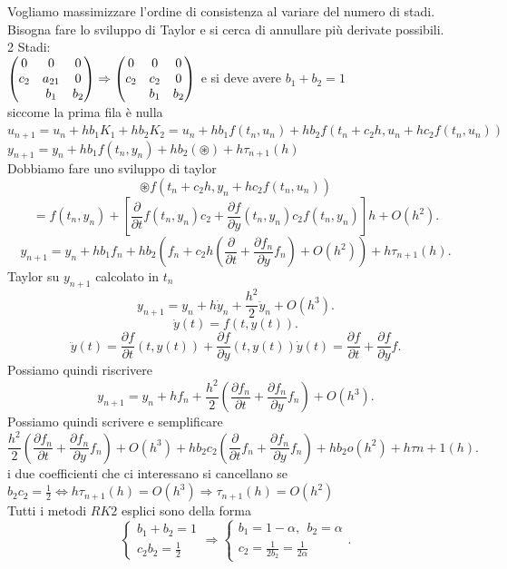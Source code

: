 \documentclass[12px]{article}
\begin{document}
	  Vogliamo massimizzare l'ordine di consistenza al variare del numero di stadi.\\
	  Bisogna fare lo sviluppo di Taylor e si cerca di annullare più derivate possibili.\\
	  2 Stadi:\\
	  $\begin{pmatrix}0 & 0 & 0\\
		  c_2 & a_{21}& 0\\
		      & b_1 & b_2\end{pmatrix} \Rightarrow \begin{pmatrix}0 & 0 & 0\\ c_2 & c_2 &0\\
		      & b_1 &b_2\end{pmatrix} $ e si deve avere $b_1 +b_2 = 1$\\
 siccome la prima fila è nulla\\
		      $u_{n+1} = u_n + hb_1K_1 + hb_2K_2 = u_n + hb_1f(t_n,u_n)+h b_2f(t_n+c_2h, u_n + hc_2f(t_n,u_n))$\\
		      $y_{n+1} = y_n + hb_1 f(t_n,y_n) + h b_2 (\circledast)+h\tau_{n+1}(h)$\\
Dobbiamo fare uno sviluppo di taylor
\[
	\circledast f(t_n + c_2h , y_n + hc_2f(t_n,u_n)) 
\] 
\[
=f(t_n,y_n) +[ \frac {\partial}{\partial t} f(t_n,y_n)c_2 + \frac{\partial f}{\partial y}(t_n,y_n)c_2 f(t_n,y_n)]h + O(h^2)
.\] 
\[
	y_{n+1} = y_n + hb_1f_n + hb_2(f_n + c_2h(\frac{\partial}{\partial t} + \frac{\partial f_n}{\partial y}f_n) +O(h^2)) + h\tau_{n+1}(h)
.\] 
Taylor su $y_{n+1}$ calcolato in $t_n$
 \[
	 y_{n+1} = y_n + h\dot y_n+ \frac{h^2}{2}\ddot y_n + O(h^3)
.\] 
\[
\dot y(t) = f(t,y(t))
.\] 
\[
	\ddot y(t) = \frac{\partial f}{\partial t}(t,y(t)) + \frac{\partial f}{\partial y}(t,y(t))\dot y(t) = \frac{\partial f}{\partial t} + \frac{\partial f}{\partial y}f
.\] 
Possiamo quindi riscrivere
 \[
	 y_{n+1} = y_n + hf_n + \frac{h^2}2 (\frac{\partial f_n}{\partial t} + \frac{\partial f_n}{\partial y} f_n) + O(h^3)
.\] 
Possiamo quindi scrivere e semplificare
\[
	\frac{h^2}2 \left(\frac{\partial f_n}{\partial t} + \frac{\partial f_n}{\partial y}f_n \right) + O(h^3) + h b_2c_2 \left(\frac{\partial}{\partial t}f_n + \frac{\partial f_n}{\partial y}f_n \right) + hb_2o(h^2) + h\tau{n+1}(h)
.\] 
i due coefficienti che ci interessano si cancellano se $b_2c_2=\frac 12 \Leftrightarrow h\tau_{n+1}(h) = O(h^3) \Rightarrow  \tau_{n+1}(h) = O(h^2)$ \\
Tutti i metodi $RK2$ esplici sono della forma
 \[
\begin{cases}
	b_1 + b_2 = 1\\
	c_2 b_2 = \frac 12
\end{cases} \Rightarrow  \begin{cases}
	b_1 = 1 - \alpha, \ \ b_2 = \alpha\\
	c_2 = \frac{1}{2b_2} = \frac 1 {2\alpha}
\end{cases}
.\] 
\end{document}

